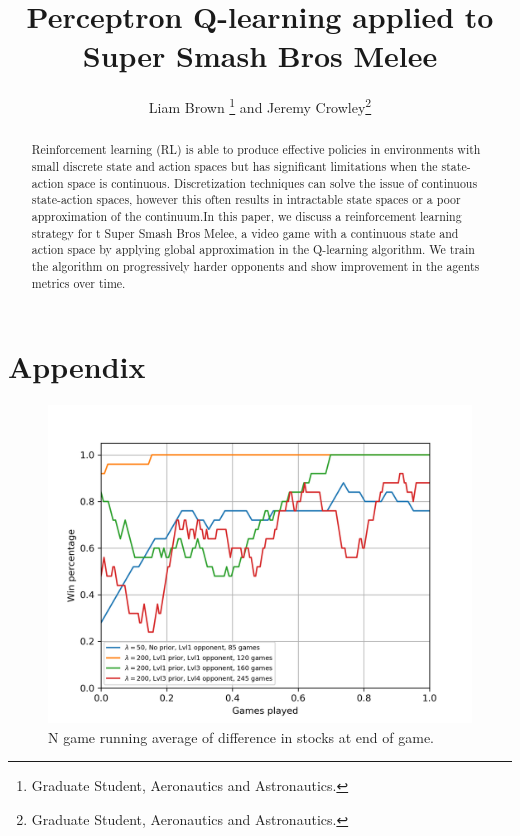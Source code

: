\documentclass[journal]{new-aiaa}
\title{Perceptron Q-learning applied to Super Smash Bros Melee}
\author{Liam Brown \footnote{Graduate Student, Aeronautics and Astronautics.} and Jeremy Crowley\footnote{Graduate Student, Aeronautics and Astronautics.}}
\affil{Stanford University, Stanford, CA, 94305}
\begin{document}
\maketitle

\begin{abstract}
Reinforcement learning (RL) is able to produce effective policies in environments with small discrete state and action spaces but has significant limitations when the state-action space is continuous. Discretization techniques can solve the issue of continuous state-action spaces, however this often results in intractable state spaces or a poor approximation of the continuum.In this paper, we discuss a reinforcement learning strategy for t Super Smash Bros Melee, a video game with a continuous state and action space by applying global approximation in the Q-learning algorithm. We train the algorithm on progressively harder opponents and show improvement in the agents metrics over time.

\end{abstract}


%
%



%
%



%
%



%
%



%
%



%
%



%
%
\newpage
\section*{Appendix}

\begin{figure}[!htb]
\centering
	\includegraphics[width=120mm]{winpctg.png}
	\caption{N game running average of difference in stocks at end of game. \label{winpctg}}
\end{figure}
\end{document}
